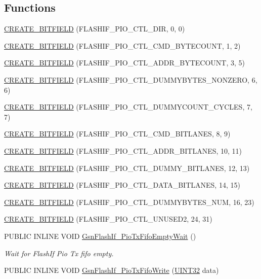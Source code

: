 \subsection*{Functions}
\begin{DoxyCompactItemize}
\item 
\hyperlink{a00501_ac574964e96e21932c219983ffe865d0f}{CREATE\_\-BITFIELD} (FLASHIF\_\-PIO\_\-CTL\_\-DIR, 0, 0)
\item 
\hyperlink{a00501_a8dc5c570a800cbb45e082460e9085bd8}{CREATE\_\-BITFIELD} (FLASHIF\_\-PIO\_\-CTL\_\-CMD\_\-BYTECOUNT, 1, 2)
\item 
\hyperlink{a00501_a12cb43657bbade809ac784e832f8100f}{CREATE\_\-BITFIELD} (FLASHIF\_\-PIO\_\-CTL\_\-ADDR\_\-BYTECOUNT, 3, 5)
\item 
\hyperlink{a00501_aac30a45d97ea8aa913ba61a794968d8a}{CREATE\_\-BITFIELD} (FLASHIF\_\-PIO\_\-CTL\_\-DUMMYBYTES\_\-NONZERO, 6, 6)
\item 
\hyperlink{a00501_abdba8e171f084913f6b71eeb7544521b}{CREATE\_\-BITFIELD} (FLASHIF\_\-PIO\_\-CTL\_\-DUMMYCOUNT\_\-CYCLES, 7, 7)
\item 
\hyperlink{a00501_a09d84b947def9793c9d6d50aa85d6c9b}{CREATE\_\-BITFIELD} (FLASHIF\_\-PIO\_\-CTL\_\-CMD\_\-BITLANES, 8, 9)
\item 
\hyperlink{a00501_abd2c4d0d7ba8b48a983e5e33991771ea}{CREATE\_\-BITFIELD} (FLASHIF\_\-PIO\_\-CTL\_\-ADDR\_\-BITLANES, 10, 11)
\item 
\hyperlink{a00501_af3392733f45ae190f8d76372dfc34915}{CREATE\_\-BITFIELD} (FLASHIF\_\-PIO\_\-CTL\_\-DUMMY\_\-BITLANES, 12, 13)
\item 
\hyperlink{a00501_abb9bd7dd28d6834de7e09e6be029c759}{CREATE\_\-BITFIELD} (FLASHIF\_\-PIO\_\-CTL\_\-DATA\_\-BITLANES, 14, 15)
\item 
\hyperlink{a00501_a114dbc49b1f14a80ac5ba8bcdc90702b}{CREATE\_\-BITFIELD} (FLASHIF\_\-PIO\_\-CTL\_\-DUMMYBYTES\_\-NUM, 16, 23)
\item 
\hyperlink{a00501_a9e27cad573f52a90684d44953768c020}{CREATE\_\-BITFIELD} (FLASHIF\_\-PIO\_\-CTL\_\-UNUSED2, 24, 31)
\item 
PUBLIC INLINE VOID \hyperlink{a00647_ga0e52d153a54a5e099ea53b4ab2ba02bc}{GsnFlashIf\_\-PioTxFifoEmptyWait} ()
\begin{DoxyCompactList}\small\item\em Wait for FlashIf Pio Tx fifo empty. \end{DoxyCompactList}\item 
PUBLIC INLINE VOID \hyperlink{a00647_ga31cfba744b7133b256ba57713dc14e0f}{GsnFlashIf\_\-PioTxFifoWrite} (\hyperlink{a00660_gae1e6edbbc26d6fbc71a90190d0266018}{UINT32} data)

\end{DoxyCompactItemize}

